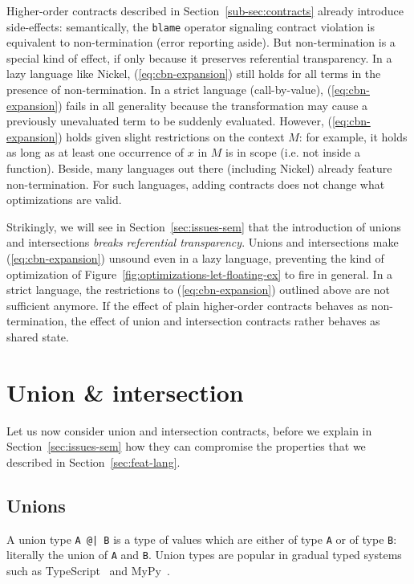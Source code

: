 \documentclass[sigplan,10pt]{acmart}
\newcommand{\nickel}[1]{\lstinline[language=nickel]{#1}}
\begin{document}
Higher-order contracts described in Section~\ref{sub-sec:contracts} already
introduce side-effects: semantically, the \nickel{blame} operator signaling
contract violation is equivalent to non-termination (error reporting aside).
But non-termination is a special kind of effect, if only because it preserves
referential transparency. In a lazy language like Nickel,
(\ref{eq:cbn-expansion}) still holds for all terms in the presence of
non-termination. In a strict language (call-by-value), (\ref{eq:cbn-expansion})
fails in all generality because the transformation may cause a previously
unevaluated term to be suddenly evaluated.  However, (\ref{eq:cbn-expansion})
holds given slight restrictions on the context $M$: for example, it holds as
long as at least one occurrence of $x$ in $M$ is in scope (i.e. not inside a
function). Beside, many languages out there (including Nickel) already feature
non-termination. For such languages, adding contracts does not change what
optimizations are valid.

Strikingly, we will see in Section~\ref{sec:issues-sem} that the introduction of
unions and intersections \emph{breaks referential transparency}. Unions and
intersections make (\ref{eq:cbn-expansion}) unsound even in a lazy language,
preventing the kind of optimization of
Figure~\ref{fig:optimizations-let-floating-ex} to fire in general. In a strict
language, the restrictions to (\ref{eq:cbn-expansion}) outlined above are not
sufficient anymore. If the effect of plain higher-order contracts behaves as
non-termination, the effect of union and intersection contracts rather behaves
as shared state.

\section{Union \& intersection}
\label{sec:union-inter}

Let us now consider union and intersection contracts, before we explain in
Section~\ref{sec:issues-sem} how they can compromise the properties that we
described in Section~\ref{sec:feat-lang}.

\subsection{Unions}

A union type \nickel{A @| B} is a type of values which are either of
type \nickel{A} or of type \nickel{B}: literally the union of
\nickel{A} and \nickel{B}. Union types are popular in gradual typed
systems such as TypeScript~\cite{TypeScriptUnions} and
MyPy~\cite{MyPyOptional}.
\end{document}
